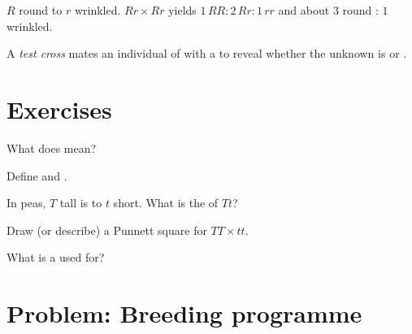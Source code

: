 \begin{example}\label{ex:g9:mendel:round}
$R$ round  to $r$ wrinkled. $Rr \times Rr$ yields 
$1\,RR : 2\,Rr : 1\,rr$ and  about $3$ round : $1$ wrinkled.
\end{example}

\begin{definition}\label{def:g9:mendel:test}
A \emph{test cross} mates an individual of 
 with a   to reveal whether the unknown is
 or .
\end{definition}

\section{Exercises}

\begin{exercise}[$\star$]\label{exo:g9:mendel:1}
What does  mean?
\end{exercise}

\begin{exercise}[$\star$]\label{exo:g9:mendel:2}
Define  and .
\end{exercise}

\begin{exercise}[$\star$]\label{exo:g9:mendel:3}
In peas, $T$ tall is  to $t$ short. What is the  of
$Tt$?
\end{exercise}

\begin{exercise}[$\star$]\label{exo:g9:mendel:4}
Draw (or describe) a Punnett square for $TT \times tt$.
\end{exercise}

\begin{exercise}[$\star$]\label{exo:g9:mendel:5}
What is a  used for?
\end{exercise}

\section{Problem: Breeding programme}

